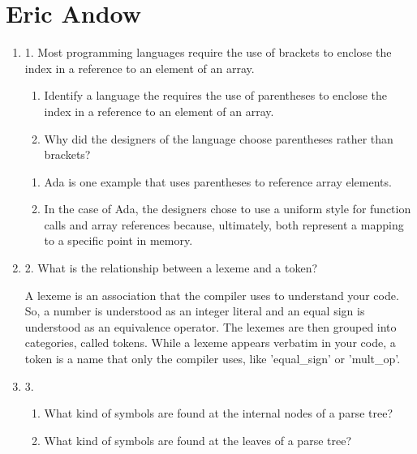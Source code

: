 
\chapter{Eric Andow}

\begin{enumerate}
  \item 1. Most programming languages require the use of brackets to
    enclose the index in a reference to an element of an array.
  \begin{enumerate}
    \item Identify a language the requires the use of parentheses
      to enclose the index in a reference to an element of an array.
    \item Why did the designers of the language choose parentheses
      rather than brackets?
    \end{enumerate}

  \begin{answer}

  \begin{enumerate}
    \item Ada is one example that uses parentheses to reference array elements.
    \item In the case of Ada, the designers chose to use a uniform style for function calls and array references because, ultimately, both represent a mapping to a specific point in memory.
    \end{enumerate}

    \end{answer}
    
  \item 2. What is the relationship between a lexeme and a token?

  \begin{answer}

    A lexeme is an association that the compiler uses to understand your code. So, a number is understood as an integer literal and an equal sign is understood as an equivalence operator. The lexemes are then grouped into categories, called tokens. While a lexeme appears verbatim in your code, a token is a name that only the compiler uses, like 'equal_sign' or 'mult_op'.

    \end{answer}

  \item 3.
  \begin{enumerate}
    \item What kind of symbols are found at the internal nodes of a
      parse tree?
    \item What kind of symbols are found at the leaves of a parse tree?
    \end{enumerate}


\end{enumerate}
